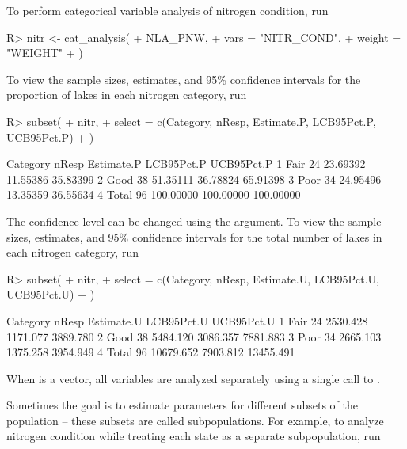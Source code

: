\documentclass[
  shortnames]{jss}
\begin{document}
To perform categorical variable analysis of nitrogen condition, run

\begin{CodeChunk}
\begin{CodeInput}
R> nitr <- cat_analysis(
+   NLA_PNW, 
+   vars = "NITR_COND",
+   weight = "WEIGHT"
+ )
\end{CodeInput}
\end{CodeChunk}

To view the sample sizes, estimates, and 95\% confidence intervals for
the proportion of lakes in each nitrogen category, run

\begin{CodeChunk}
\begin{CodeInput}
R> subset(
+   nitr,
+   select = c(Category, nResp, Estimate.P, LCB95Pct.P, UCB95Pct.P)
+ )
\end{CodeInput}
\begin{CodeOutput}
  Category nResp Estimate.P LCB95Pct.P UCB95Pct.P
1     Fair    24   23.69392   11.55386   35.83399
2     Good    38   51.35111   36.78824   65.91398
3     Poor    34   24.95496   13.35359   36.55634
4    Total    96  100.00000  100.00000  100.00000
\end{CodeOutput}
\end{CodeChunk}

The confidence level can be changed using the  argument. To
view the sample sizes, estimates, and 95\% confidence intervals for the
total number of lakes in each nitrogen category, run

\begin{CodeChunk}
\begin{CodeInput}
R> subset(
+   nitr,
+   select = c(Category, nResp, Estimate.U, LCB95Pct.U, UCB95Pct.U)
+ )
\end{CodeInput}
\begin{CodeOutput}
  Category nResp Estimate.U LCB95Pct.U UCB95Pct.U
1     Fair    24   2530.428   1171.077   3889.780
2     Good    38   5484.120   3086.357   7881.883
3     Poor    34   2665.103   1375.258   3954.949
4    Total    96  10679.652   7903.812  13455.491
\end{CodeOutput}
\end{CodeChunk}

When  is a vector, all variables are analyzed separately
using a single call to .

Sometimes the goal is to estimate parameters for different subsets of
the population -- these subsets are called subpopulations. For example,
to analyze nitrogen condition while treating each state as a separate
subpopulation, run
\end{document}
